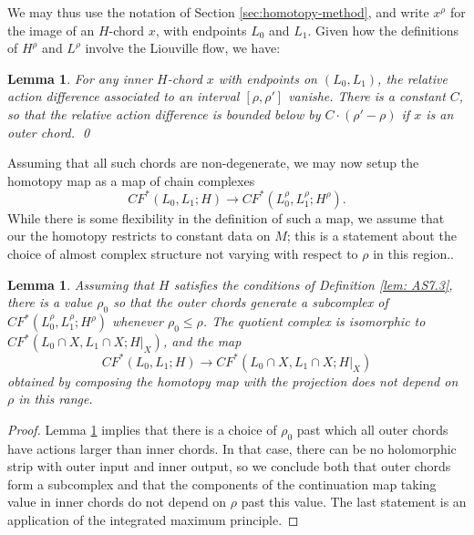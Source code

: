 \documentclass{article}
\theoremstyle{plain}%
\newtheorem{lem}[thm]{Lemma}
\theoremstyle{definition}
\numberwithin{equation}{section}
\numberwithin{figure}{section}
\def\cA{{\mathbin{\cal A}}}
\begin{document}
We may thus use the notation of Section \ref{sec:homotopy-method}, and write $x^{\rho}$ for the image of an $H$-chord $x$, with endpoints $L_0$ and $L_1$. Given how the definitions of $H^\rho$ and $L^\rho$ involve the Liouville flow, we have:
\begin{lem} \label{lem:action_rescale}
  For any inner $H$-chord $x$ with endpoints on $(L_0,L_1)$, the relative action difference associated to an interval $[\rho,\rho']$ vanishe. There is a constant $C$, so that the relative action difference is bounded below by $C \cdot (\rho'- \rho)$ if $x$ is an outer chord.
  \qed
\end{lem}
Assuming that all such chords are non-degenerate, we may now setup the homotopy map as a map of chain complexes
\begin{equation}
 CF^*(L_0,L_1; H) \to  CF^*(L^\rho_0,L^\rho_1; H^\rho).
\end{equation}
While there is some flexibility in the definition of such a map, we assume that our the homotopy restricts to constant data on $M$; this is a statement about the choice of almost complex structure not varying with respect to $\rho$ in this region..
\begin{lem}
  Assuming that $H$ satisfies the conditions of Definition \ref{lem: AS7.3}, there is a value $\rho_0$ so that the outer chords generate a subcomplex of $CF^*(L^\rho_0,L^\rho_1; H^\rho)$ whenever $\rho_0 \leq \rho $.  The quotient complex is isomorphic to $CF^*(L_0 \cap X, L_1 \cap X ; H|_X)$, and the map
  \begin{equation}
      CF^*(L_0,L_1; H)  \to    CF^*(L_0\cap X , L_1\cap X ; H|_X)
    \end{equation}
    obtained by composing the homotopy map with the projection does not depend on $\rho$ in this range.
\end{lem}
\begin{proof}
  Lemma \ref{lem:action_rescale} implies that there is a choice of $\rho_0$ past which all outer chords have actions larger than inner chords. In that case, there can be no holomorphic strip with outer input and inner output, so we conclude both that outer chords form a subcomplex and that the components of the continuation map taking value in inner chords do not depend on $\rho$ past this value. The last statement is an application of the integrated maximum principle.
\end{proof}
\end{document}
